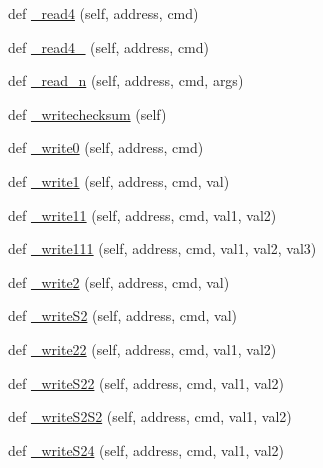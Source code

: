 \begin{DoxyCompactItemize}
\item 
def \mbox{\hyperlink{classtoxic__hardware_1_1roboclaw__3_1_1Roboclaw_ab914d94db06afb55cd43bd797ee5938a}{\+\_\+read4}} (self, address, cmd)
\item 
def \mbox{\hyperlink{classtoxic__hardware_1_1roboclaw__3_1_1Roboclaw_a3bb41979a524d23c5330db2b445a4a6f}{\+\_\+read4\+\_}} (self, address, cmd)
\item 
def \mbox{\hyperlink{classtoxic__hardware_1_1roboclaw__3_1_1Roboclaw_a6758fe3e66445946e27903a47e330d5b}{\+\_\+read\+\_\+n}} (self, address, cmd, args)
\item 
def \mbox{\hyperlink{classtoxic__hardware_1_1roboclaw__3_1_1Roboclaw_af64933c3b7db755b6709d9aaba340aec}{\+\_\+writechecksum}} (self)
\item 
def \mbox{\hyperlink{classtoxic__hardware_1_1roboclaw__3_1_1Roboclaw_a53e66b2abf6128eab409cb25dcf5f39b}{\+\_\+write0}} (self, address, cmd)
\item 
def \mbox{\hyperlink{classtoxic__hardware_1_1roboclaw__3_1_1Roboclaw_a3a71ce5bc0ecf964d3b920c8bef96436}{\+\_\+write1}} (self, address, cmd, val)
\item 
def \mbox{\hyperlink{classtoxic__hardware_1_1roboclaw__3_1_1Roboclaw_a583baf56af1846dfe43c7b76ed20784c}{\+\_\+write11}} (self, address, cmd, val1, val2)
\item 
def \mbox{\hyperlink{classtoxic__hardware_1_1roboclaw__3_1_1Roboclaw_ac0745e9d0910b3a66157a45cf3142dee}{\+\_\+write111}} (self, address, cmd, val1, val2, val3)
\item 
def \mbox{\hyperlink{classtoxic__hardware_1_1roboclaw__3_1_1Roboclaw_a88de3e54ecc50437eb3799d53d4aba3f}{\+\_\+write2}} (self, address, cmd, val)
\item 
def \mbox{\hyperlink{classtoxic__hardware_1_1roboclaw__3_1_1Roboclaw_a33f4f881d630c20a3ba1e023dd2251e9}{\+\_\+write\+S2}} (self, address, cmd, val)
\item 
def \mbox{\hyperlink{classtoxic__hardware_1_1roboclaw__3_1_1Roboclaw_ae4eb5de67308bec37b6fe995cb88a091}{\+\_\+write22}} (self, address, cmd, val1, val2)
\item 
def \mbox{\hyperlink{classtoxic__hardware_1_1roboclaw__3_1_1Roboclaw_afb7691607c5a92004503e91af4ed905b}{\+\_\+write\+S22}} (self, address, cmd, val1, val2)
\item 
def \mbox{\hyperlink{classtoxic__hardware_1_1roboclaw__3_1_1Roboclaw_ae7f3cc692531430614dd0f95fe2be1a9}{\+\_\+write\+S2\+S2}} (self, address, cmd, val1, val2)
\item 
def \mbox{\hyperlink{classtoxic__hardware_1_1roboclaw__3_1_1Roboclaw_a2acfdb332e8c1ae4d0cca985f2d690bf}{\+\_\+write\+S24}} (self, address, cmd, val1, val2)

\end{DoxyCompactItemize}
